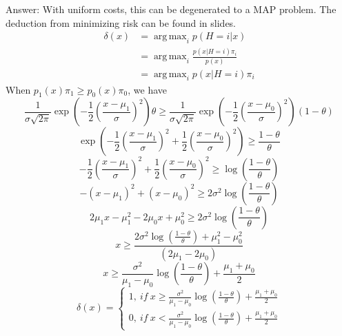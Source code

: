 \documentclass{article}
\newenvironment{answer}{\par\begingroup\color{answer}Answer: }{\endgroup}
\DeclareMathOperator*{\argmax}{arg\,max}
\begin{document}
\begin{itemize}
\begin{answer}
With uniform costs, this can be degenerated to a MAP problem. The deduction from minimizing risk can be found in slides.
\begin{align*}
\delta(x) &= \argmax_i p(H=i | x) \\
            &= \argmax_i \frac{p(x|H=i)\pi_i}{p(x)} \\ 
            &= \argmax_i p(x|H=i)\pi_i
\end{align*}
When $p_1(x)\pi_1 \geq p_0(x)\pi_0$, we have
\[
    \frac{1}{\sigma\sqrt{2\pi}} \exp(-\frac12 (\frac{x -\mu_1}{\sigma})^2) \theta \geq
\frac{1}{\sigma\sqrt{2\pi}} \exp(-\frac12 (\frac{x -\mu_0}{\sigma})^2) (1 - \theta)
\]
\[
 \exp(-\frac12 (\frac{x -\mu_1}{\sigma})^2 + \frac12 (\frac{x -\mu_0}{\sigma})^2) \geq \frac{1 - \theta}{\theta}
\]
\[
-\frac12 (\frac{x -\mu_1}{\sigma})^2 + \frac12 (\frac{x -\mu_0}{\sigma})^2 \geq \log(\frac{1 - \theta}{\theta})
\]
\[
- (x -\mu_1)^2 +  (x -\mu_0)^2 \geq 2 \sigma^2 \log(\frac{1 - \theta}{\theta})
\]
\[
2\mu_1x - \mu_1^2 -2\mu_0 x + \mu_0^2 \geq 2 \sigma^2 \log(\frac{1 - \theta}{\theta})
\]
\[
x  \geq \frac{2 \sigma^2 \log(\frac{1 - \theta}{\theta}) + \mu_1^2 - \mu_0^2 }{(2\mu_1 - 2\mu_0)}
\]
\[
x  \geq  \frac{\sigma^2}{\mu_1 - \mu_0} \log(\frac{1 - \theta}{\theta}) + \frac{\mu_1 + \mu_0}{2}
\]
\[
  \delta(x) = 
\begin{cases}
  1,~if~x \geq \frac{\sigma^2}{\mu_1 - \mu_0} \log(\frac{1 - \theta}{\theta}) + \frac{\mu_1 + \mu_0}{2}\\
  0,~if~x < \frac{\sigma^2}{\mu_1 - \mu_0} \log(\frac{1 - \theta}{\theta}) + \frac{\mu_1 + \mu_0}{2}
\end{cases}
\]
\end{answer}


\end{itemize}
\end{document}
